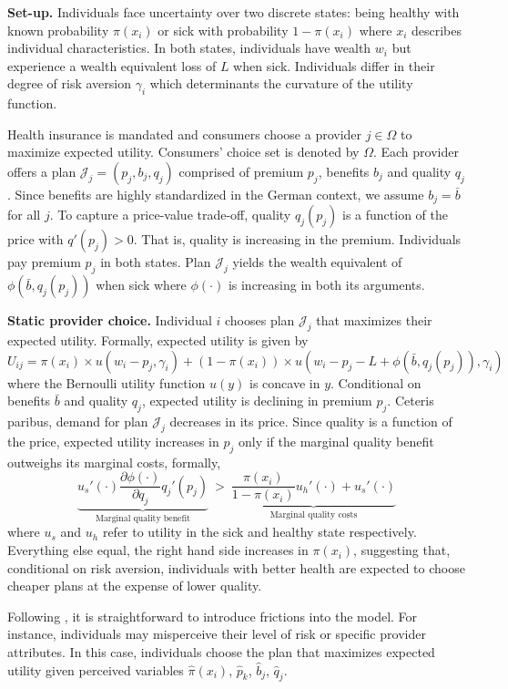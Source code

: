 \documentclass[a4paper, 11pt, english]{article}
\begin{document}
\textbf{Set-up.} Individuals face uncertainty over two discrete states: being healthy with known probability $\pi(x_i)$ or sick with probability $1-\pi(x_i)$ where $x_i$ describes individual characteristics. In both states, individuals have wealth $w_i$ but experience a wealth equivalent loss of $L$ when sick. Individuals differ in their degree of risk aversion $\gamma_i$ which determinants the curvature of the utility function.

Health insurance is mandated and consumers choose a provider $j \in \Omega$  to maximize expected utility. Consumers' choice set is denoted by $\Omega$.  Each provider offers a plan  $\mathcal{J}_j=(p_j,b_j,q_j)$ comprised of premium $p_j$, benefits $b_j$ and quality $q_j$. Since benefits are highly standardized in the German context, we assume $b_j=\bar{b}$ for all $j$. To capture a price-value trade-off, quality $q_j(p_j)$ is a function of the price with $q'(p_j)>0$. That is, quality is increasing in the premium. Individuals pay premium $p_j$ in both states. Plan $\mathcal{J}_j$ yields the wealth equivalent of $\phi(\bar{b},q_j(p_j))$ when sick where $\phi(\cdot)$ is increasing in both its arguments.

\textbf{Static provider choice.} Individual $i$ chooses plan $\mathcal{J}_j$ that maximizes their expected utility. Formally, expected utility is given by
\begin{equation*}
	U_{ij} = \pi(x_i) \times u\left(w_i - p_j, \gamma_i\right) + (1-\pi(x_i)) \times u\left(w_i - p_j - L + \phi(\bar{b},q_j(p_j)), \gamma_i \right)
\end{equation*}
where the Bernoulli utility function $u(y)$ is concave in $y$. Conditional on benefits $\bar{b}$ and quality $q_j$, expected utility is declining in premium $p_j$. Ceteris paribus, demand for plan $\mathcal{J}_j$ decreases in its price. Since quality is a function of the price, expected utility increases in $p_j$ only if the marginal quality benefit outweighs its marginal costs, formally,
$$\underbrace{u_s'(\cdot) \frac{\partial \phi(\cdot)}{\partial q_j} q_j'(p_j)}_{\text{Marginal quality benefit}} \ > \ \underbrace{\frac{\pi(x_i)}{1-\pi(x_i)} u_h'(\cdot) + u_s'(\cdot)}_{\text{Marginal quality costs}}$$
where $u_s$ and $u_h$ refer to utility in the sick and healthy state respectively. Everything else equal, the right hand side increases in $\pi(x_i)$, suggesting that, conditional on risk aversion, individuals with better health are expected to choose cheaper plans at the expense of lower quality. 

Following \citet{Handel2015}, it is straightforward to introduce frictions into the model. For instance, individuals may misperceive their level of risk or specific provider attributes. In this case, individuals choose the plan that maximizes expected utility given perceived variables $\hat{\pi}(x_i)$, $\hat{p}_k$, $\hat{b}_j$, $\hat{q}_j$.
\end{document}
